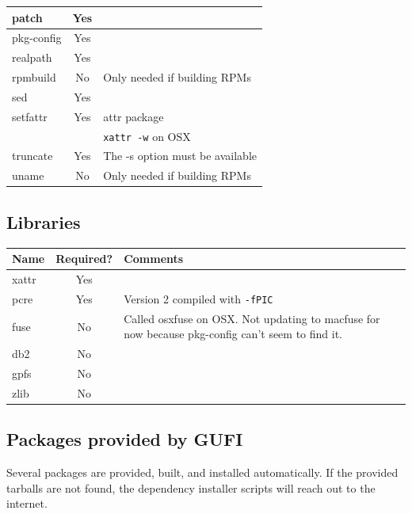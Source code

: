 \begin{center}
\begin{tabularx}{\textwidth}{| l | c | X | }
  \hline
  patch & Yes & \\
  \hline
  pkg-config & Yes & \\
  \hline
  realpath & Yes & \\
  \hline
  rpmbuild & No & Only needed if building RPMs \\
  \hline
  sed & Yes & \\
  \hline
  setfattr & Yes & attr package \\
  & & \texttt{xattr -w} on OSX \\
  \hline
  truncate & Yes & The -s option must be available \\
  \hline
  uname & No & Only needed if building RPMs \\
  \hline
\end{tabularx}
\end{center}

\subsection{Libraries}
\begin{center}
\begin{tabularx}{\textwidth}{| l | c | X |}
  \hline
  Name & Required? & Comments \\
  \hline
  xattr & Yes & \\
  \hline
  pcre & Yes & Version 2 compiled with \texttt{-fPIC} \\
  \hline
  fuse & No & Called osxfuse on OSX. Not updating to macfuse for now
  because pkg-config can't seem to find it. \\
  \hline
  db2 & No & \\
  \hline
  gpfs & No & \\
  \hline
  zlib & No & \\
  \hline
\end{tabularx}
\end{center}

\subsection{Packages provided by GUFI}
Several packages are provided, built, and installed automatically. If
the provided tarballs are not found, the dependency installer scripts
will reach out to the internet.

